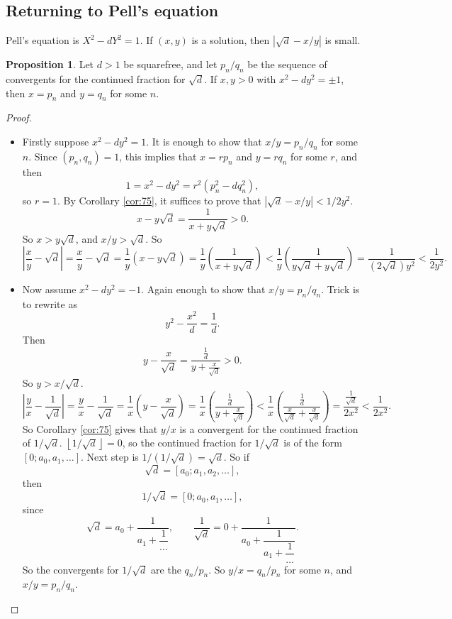 \documentclass{article}
\newcommand{\rb}[1]{\left( #1 \right)}
\renewcommand{\sb}[1]{\left[ #1 \right]}
\newcommand{\abs}[1]{\left\lvert #1 \right\rvert}
\newcommand{\fb}[1]{\left\lfloor #1 \right\rfloor}
\theoremstyle{definition}\newtheorem{definition}{Definition}
\theoremstyle{definition}\newtheorem{remark}[definition]{Remark}
\theoremstyle{definition}\newtheorem*{example}{Example}
\theoremstyle{definition}\newtheorem*{note}{Note}
\newtheorem{proposition}[definition]{Proposition}
\begin{document}

\subsection{Returning to Pell's equation}

Pell's equation is $ X^2 - dY^2 = 1 $. If $ \rb{x, y} $ is a solution, then $ \abs{\sqrt{d} - x / y} $ is small.

\begin{proposition}
Let $ d > 1 $ be squarefree, and let $ p_n / q_n $ be the sequence of convergents for the continued fraction for $ \sqrt{d} $. If $ x, y > 0 $ with $ x^2 - dy^2 = \pm 1 $, then $ x = p_n $ and $ y = q_n $ for some $ n $.
\end{proposition}

\begin{proof}
\hfill
\begin{itemize}
\item Firstly suppose $ x^2 - dy^2 = 1 $. It is enough to show that $ x / y = p_n / q_n $ for some $ n $. Since $ \rb{p_n, q_n} = 1 $, this implies that $ x = rp_n $ and $ y = rq_n $ for some $ r $, and then
$$ 1 = x^2 - dy^2 = r^2\rb{p_n^2 - dq_n^2}, $$
so $ r = 1 $. By Corollary \ref{cor:75}, it suffices to prove that $ \abs{\sqrt{d} - x / y} < 1 / 2y^2 $.
$$ x - y\sqrt{d} = \dfrac{1}{x + y\sqrt{d}} > 0. $$
So $ x > y\sqrt{d} $, and $ x / y > \sqrt{d} $. So
$$ \abs{\dfrac{x}{y} - \sqrt{d}} = \dfrac{x}{y} - \sqrt{d} = \dfrac{1}{y}\rb{x - y\sqrt{d}} = \dfrac{1}{y}\rb{\dfrac{1}{x + y\sqrt{d}}} < \dfrac{1}{y}\rb{\dfrac{1}{y\sqrt{d} + y\sqrt{d}}} = \dfrac{1}{\rb{2\sqrt{d}}y^2} < \dfrac{1}{2y^2}. $$
\item Now assume $ x^2 - dy^2 = -1 $. Again enough to show that $ x / y = p_n / q_n $. Trick is to rewrite as
$$ y^2 - \dfrac{x^2}{d} = \dfrac{1}{d}. $$
Then
$$ y - \dfrac{x}{\sqrt{d}} = \dfrac{\tfrac{1}{d}}{y + \tfrac{x}{\sqrt{d}}} > 0. $$
So $ y > x / \sqrt{d} $.
$$ \abs{\dfrac{y}{x} - \dfrac{1}{\sqrt{d}}} = \dfrac{y}{x} - \dfrac{1}{\sqrt{d}} = \dfrac{1}{x}\rb{y - \dfrac{x}{\sqrt{d}}} = \dfrac{1}{x}\rb{\dfrac{\tfrac{1}{d}}{y + \tfrac{x}{\sqrt{d}}}} < \dfrac{1}{x}\rb{\dfrac{\tfrac{1}{d}}{\tfrac{x}{\sqrt{d}} + \tfrac{x}{\sqrt{d}}}} = \dfrac{\tfrac{1}{\sqrt{d}}}{2x^2} < \dfrac{1}{2x^2}. $$
So Corollary \ref{cor:75} gives that $ y / x $ is a convergent for the continued fraction of $ 1 / \sqrt{d} $. $ \fb{1 / \sqrt{d}} = 0 $, so the continued fraction for $ 1 / \sqrt{d} $ is of the form $ \sb{0; a_0, a_1, \dots} $. Next step is $ 1 / \rb{1 / \sqrt{d}} = \sqrt{d} $. So if
$$ \sqrt{d} = \sb{a_0; a_1, a_2, \dots}, $$
then
$$ 1 / \sqrt{d} = \sb{0; a_0, a_1, \dots}, $$
since
$$ \sqrt{d} = a_0 + \dfrac{1}{a_1 + \dfrac{1}{\dots}}, \qquad \dfrac{1}{\sqrt{d}} = 0 + \dfrac{1}{a_0 + \dfrac{1}{a_1 + \dfrac{1}{\dots}}}. $$
So the convergents for $ 1 / \sqrt{d} $ are the $ q_n / p_n $. So $ y / x = q_n / p_n $ for some $ n $, and $ x / y = p_n / q_n $.
\end{itemize}
\end{proof}
\end{document}
